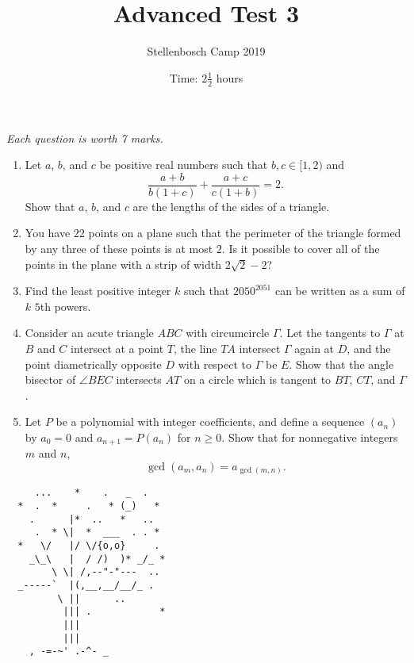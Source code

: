 \documentclass{article}
\title{Advanced Test 3}
\author{Stellenbosch Camp 2019}
\date{Time: $2\frac{1}{2}$ hours}
\begin{document}
\maketitle
\thispagestyle{empty}

\hfill\textit{Each question is worth 7 marks.}

\vfill


\begin{enumerate}[1.]

\item %
Let $a$, $b$, and $c$ be positive real numbers such that $b, c \in [1,2)$ and
\[ \frac{a+b}{b(1+c)} +\frac{a+c}{c(1+b)} = 2. \]
Show that $a$, $b$, and $c$ are the lengths of the sides of a triangle.


\item %
You have $22$ points on a plane such that the perimeter of the triangle formed by any three of these points is at most $2$. Is it possible to cover all of the points in the plane with a strip of width $2\sqrt{2} - 2$? 


\item %
Find the least positive integer $k$ such that $2050^{2051}$ can be written as a sum of $k$ $5$th powers.


\item %
Consider an acute triangle $ABC$ with circumcircle $\Gamma$.
Let the tangents to $\Gamma$ at $B$ and $C$ intersect at a point $T$, the line $TA$ intersect $\Gamma$ again at $D$, and the point diametrically opposite $D$ with respect to $\Gamma$ be $E$.
Show that the angle bisector of $\angle BEC$ intersects $AT$ on a circle which is tangent to $BT$, $CT$, and $\Gamma$.


\item %
Let $P$ be a polynomial with integer coefficients, and define a sequence $(a_n)$ by $a_0 = 0$ and $a_{n+1} = P(a_n)$ for $n \geq 0$.
Show that for nonnegative integers $m$ and $n$,
\[ \gcd(a_m,a_n) = a_{\gcd(m,n)}. \]


\end{enumerate}


\vfill
\begin{center}
\begin{BVerbatim}
     ...    *    .   _  .
  *  .  *     .   * (_)   *
    .      |*  ..   *   ..
     .  * \|  *  ___  . . *
  *   \/   |/ \/{o,o}     .
    _\_\   |  / /)  )* _/_ *
        \ \| /,--"-"---  ..
  _-----`  |(,__,__/__/_ .
         \ ||      ..
          ||| .            *
          |||
          |||
    , -=-~' .-^- _
\end{BVerbatim}
\end{center}
\end{document}
